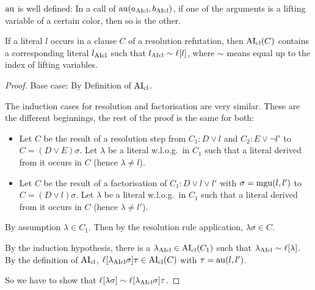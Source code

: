 \documentclass[,%
	paper=a4,%
	DIV14, %
	twoside=false,%
	liststotoc,
	bibtotoc,
	draft=false,%
	numbers=noendperiod
]{scrartcl}
\begin{document}
\begin{conj}
	$\operatorname{au}$ is well defined:
	In a call of $\operatorname{au}(a_{\operatorname{AIcl}}, b_{\operatorname{AIcl}})$, if one of the arguments is a lifting variable of a certain color, then so is the other.
\end{conj}


\begin{lemma} 
	\label{lemma:literal_in_clause_similar}
	If a literal $l$ occurs in a clause $C$ of a resolution refutation,
	then $\operatorname{AI}_\mathrm{cl}(C)$ contains a corresponding literal $l_{\operatorname{AIcl}}$ such that $l_{\operatorname{AIcl}} \sim \ell[l]$, where $\sim$ means equal up to the index of lifting variables.
\end{lemma}
\begin{proof}
	Base case: By Definition of $\operatorname{AI}_\mathrm{cl}$.

	The induction cases for resolution and factorisation are very similar. These are the different beginnings, the rest of the proof is the same for both:

	\begin{itemize}
		\item
			Let $C$ be the result of a resolution step from $C_1: D\lor l$ and $C_2: E\lor \lnot l'$ to $C = (D \lor E)\sigma$.
			Let $\lambda$ be a literal w.l.o.g.\ in $C_1$ such that a literal derived from it occurs in $C$ (hence $\lambda \neq l$). 

		\item
			Let $C$ be the result of a factorisation of $C_1: D \lor l \lor l'$ with $\sigma = \operatorname{mgu}(l, l')$ to $C = (D \lor l)\sigma$. 
			Let $\lambda$ be a literal w.l.o.g.\ in $C_1$ such that a literal derived from it occurs in $C$ (hence $\lambda \neq l'$). 
	\end{itemize}


	By assumption $\lambda \in C_1$. Then by the resolution rule application, $\lambda\sigma \in C$.

	\newcommand{\lclOne}{\lambda\cl}
	By the induction hypothesis, there is a $\lclOne \in \AIclause(C_1)$ such that $\lclOne \sim \lifboth{\lambda}$.
	By the definition of $\operatorname{AI}_\mathrm{cl}$, $\lifboth{\lclOne\sigma}\tau \in \AIclause(C)$ 
	with $\tau = \operatorname{au}(l, l')$.

	So we have to show that $\ell[ \lambda \sigma ]  \sim \ell[\lambda_{\operatorname{AIcl}}\sigma]\tau$.


\end{proof}
\end{document}
